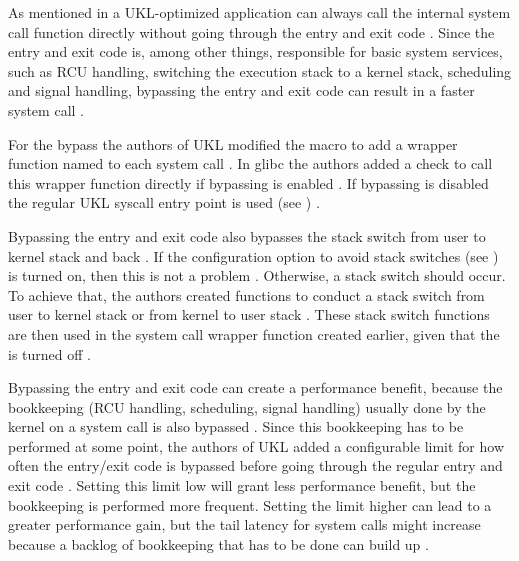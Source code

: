 \documentclass[10pt,twocolumn,a4paper]{article}
\begin{document}
      As mentioned in  a UKL-optimized application can
      always call the internal system call function directly without going through the entry and
      exit code \cite{ukl-github-bypass}.
      Since the entry and exit code is, among other things, responsible for basic system services,
      such as RCU handling, switching the execution stack to a kernel stack, scheduling and signal
      handling, bypassing the entry and exit code can result in a faster system call \cite{raza23}.

      For the bypass the authors of UKL modified the  macro to add
      a wrapper function named  to each system call \cite{ukl-github-bypass}.
      In glibc the authors added a check to call this wrapper function 
      directly if bypassing is enabled \cite{ukl-glibc-bypass}.
      If bypassing is disabled the regular UKL syscall entry point is used 
      (see ) \cite{ukl-glibc-bypass}.
      
      Bypassing the entry and exit code also bypasses the stack switch from user to kernel stack 
      and back \cite{ukl-github-bypass}.
      If the configuration option to avoid stack switches (see ) is
      turned on, then this is not a problem \cite{ukl-github-bypass}.
      Otherwise, a stack switch should occur.
      To achieve that, the authors created functions to conduct a stack switch from user to kernel stack 
      or from kernel to user stack \cite{ukl-github-bypass}.
      These stack switch functions are then used in the system call wrapper function created earlier, 
      given that the  is turned off \cite{ukl-github-bypass}.

      Bypassing the entry and exit code can create a performance benefit, because the bookkeeping
      (RCU handling, scheduling, signal handling) usually done by the kernel on a system call is also
      bypassed \cite{ukl-github-bypass}.
      Since this bookkeeping has to be performed at some point, the authors of UKL added a configurable
      limit for how often the entry/exit code is bypassed before going through the regular entry 
      and exit code \cite{ukl-github-bypass}.
      Setting this limit low will grant less performance benefit, but the bookkeeping is performed
      more frequent.
      Setting the limit higher can lead to a greater performance gain, but the tail latency for system 
      calls might increase because a backlog of bookkeeping that has to be done can build 
      up \cite{ukl-github-bypass}.
\end{document}
